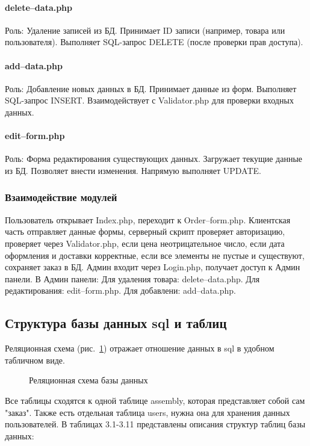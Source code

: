 \paragraph{delete--data.php}
Роль: Удаление записей из БД.
Принимает ID записи (например, товара или пользователя).
Выполняет SQL-запрос DELETE (после проверки прав доступа).
\paragraph{add--data.php}
Роль: Добавление новых данных в БД.
Принимает данные из форм.
Выполняет SQL-запрос INSERT.
Взаимодействует с Validator.php для проверки входных данных.

\paragraph{edit--form.php}
Роль: Форма редактирования существующих данных.
Загружает текущие данные из БД.
Позволяет внести изменения.
Напрямую выполняет UPDATE.

\subsubsection{Взаимодействие модулей}
Пользователь открывает Index.php, переходит к Order--form.php.
Клиентская часть отправляет данные формы, серверный скрипт проверяет авторизацию, проверяет через Validator.php, если цена неотрицательное число, если дата оформления и доставки корректные, если все элементы не пустые и существуют, сохраняет заказ в БД.
Админ входит через Login.php, получает доступ к Админ панели.
В Админ панели:
Для удаления товара: delete--data.php.
Для редактирования: edit--form.php.
Для добавлени: add--data.php.

\newpage
\subsection{Структура базы данных sql и таблиц}

Реляционная схема (рис.~\ref{struct:image}) отражает отношение данных в sql в удобном табличном виде.

\vspace{-8mm} 
\begin{figure}[ht]
\caption{Реляционная схема базы данных}
\label{struct:image}
\end{figure}

Все таблицы сходятся к одной таблице assembly, которая представляет собой сам "заказ". Также есть отдельная таблица users, нужна она для хранения данных пользователей.
В таблицах 3.1-3.11 представлены описания структур таблиц базы данных:

